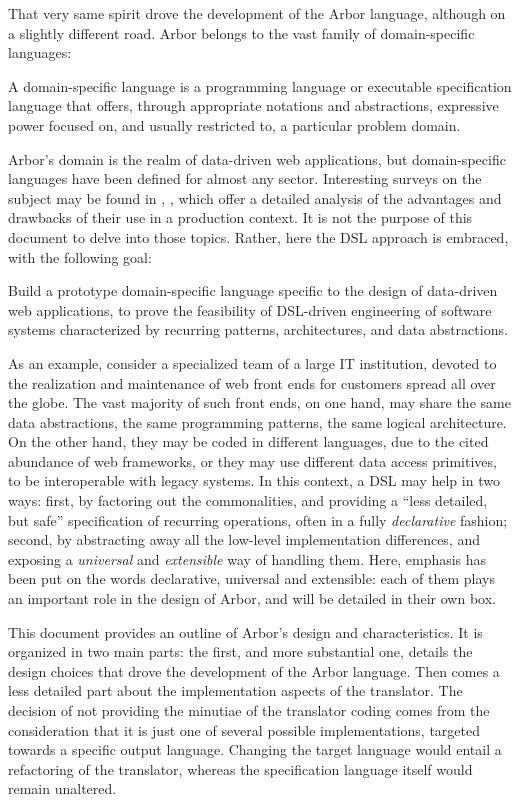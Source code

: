 \documentclass[12pt]{article} %
\newcommand{\ddwa}{data-driven web application}
\newcommand{\dsl}{domain-specific language}
\newcommand{\Dsl}{Domain-specific language}
\newcommand{\DSL}{DSL}
\newcommand{\A}{Arbor}
\newcommand{\q}[1]{``#1''}
\begin{document}
That very same spirit drove the development of the \A{} language, although on a slightly different road. \A{} belongs to the vast family of \dsl{}s\cite{dslannot}:

\begin{tcolorbox}[colback=cyan!5!white,colframe=blue!75!black,title=\Dsl{}]
A \dsl{} is a programming language or executable specification language that offers, through appropriate notations and abstractions, expressive power focused on, and usually restricted to, a particular problem domain.
\end{tcolorbox}


\A{}'s domain is the realm of data-driven web applications, but \dsl{}s have been defined for almost any sector. Interesting surveys on the subject may be found in \cite{dslannot}, \cite{dsltheor}, which offer a detailed analysis of the advantages and drawbacks of their use in a production context.
It is not the purpose of this document to delve into those topics. Rather, here the \DSL{} approach is embraced, with the following goal:
\begin{tcolorbox}[colback=green!5!white,colframe=yellow!75!black,title=Goal]
Build a prototype \dsl{} specific to the design of \ddwa{}s, to prove the feasibility of \DSL{}-driven engineering of software systems characterized by recurring patterns, architectures, and data abstractions.
\end{tcolorbox}
As an example, consider a specialized team of a large IT institution, devoted to the realization and maintenance of web front ends for customers spread all over the globe. The vast majority of such front ends, on one hand, may share the same data abstractions, the same programming patterns, the same logical architecture. On the other hand, they may be coded in different languages, due to the cited abundance of web frameworks, or they may use different data access primitives, to be interoperable with legacy systems. In this context, a \DSL{} may help in two ways: first, by factoring out the commonalities, and providing a \q{less detailed, but safe} specification of recurring operations, often in a fully \emph{declarative} fashion; second, by abstracting away all the low-level implementation differences, and exposing a \emph{universal} and \emph{extensible} way of handling them. Here, emphasis has been put on the words declarative, universal and extensible: each of them plays an important role in the design of \A{}, and will be detailed in their own box.

This document provides an outline of \A{}'s design and characteristics. It is organized in two main parts: the first, and more substantial one, details the design choices that drove the development of the \A{} language. Then comes a less detailed part about the implementation aspects of the translator. The decision of not providing the minutiae of the translator coding comes from the consideration that it is just one of several possible implementations, targeted towards a specific output language. Changing the target language would entail a refactoring of the translator, whereas the specification language itself would remain unaltered.
\end{document}
